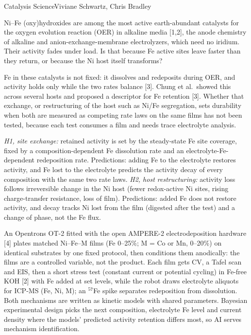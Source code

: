 \documentclass[11pt,letterpaper]{article}
\begin{document}
  {Catalysis Science}{Viviane Schwartz, Chris Bradley}

 Ni--Fe (oxy)hydroxides are among the most active earth-abundant catalysts for
the oxygen evolution reaction (OER) in alkaline media [1,2], the anode chemistry of alkaline and
anion-exchange-membrane electrolyzers, which need no iridium. Their activity fades under load. Is
that because Fe active sites leave faster than they return, or because the Ni host itself
transforms?

 Fe in these catalysts is not fixed: it dissolves and redeposits during OER, and
activity holds only while the two rates balance [3]. Chung et al.\ showed this across several hosts
and proposed a descriptor for Fe retention [3]. Whether that exchange, or restructuring of the host
such as Ni/Fe segregation, sets durability when both are measured as competing rate laws on the same
films has not been tested, because each test consumes a film and needs trace electrolyte analysis.

 \emph{H1, site exchange:} retained activity is set by the steady-state Fe site
coverage, fixed by a composition-dependent Fe dissolution rate and an electrolyte-Fe-dependent
redeposition rate. Predictions: adding Fe to the electrolyte restores activity, and Fe lost to the
electrolyte predicts the activity decay of every composition with the same two rate laws.
\emph{H2, host restructuring:} activity loss follows irreversible change in the Ni host (fewer
redox-active Ni sites, rising charge-transfer resistance, loss of film). Predictions: added Fe does
not restore activity, and decay tracks Ni lost from the film (digested after the test) and a change
of phase, not the Fe flux.

 An Opentrons OT-2 fitted with the open AMPERE-2 electrodeposition hardware [4]
plates matched Ni--Fe--M films (Fe 0--25\%; M = Co or Mn, 0--20\%) on identical substrates by one
fixed protocol, then conditions them anodically: the films are a controlled variable, not the product. Each film gets CV, a Tafel
scan and EIS, then a short stress test (constant current or potential cycling) in Fe-free KOH [2]
with Fe added at set levels, while the robot draws electrolyte aliquots for ICP-MS (Fe, Ni, M); an $^{57}$Fe spike separates
redeposition from dissolution. Both
mechanisms are written as kinetic models with shared parameters. Bayesian experimental design picks
the next composition, electrolyte Fe level and current density where the models' predicted activity
retention differs most, so AI serves mechanism identification.
\end{document}
